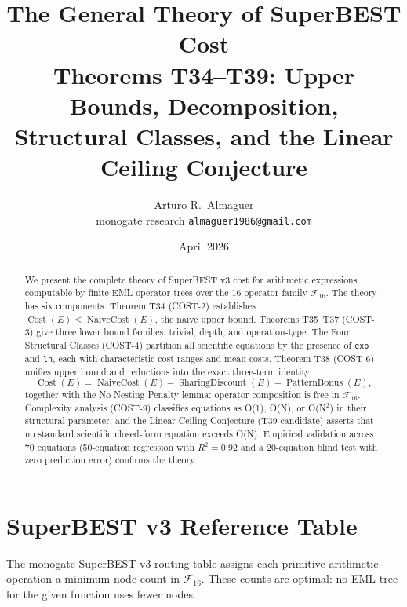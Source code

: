 \documentclass[12pt,a4paper]{article}
\title{The General Theory of SuperBEST Cost\\[6pt]
       \large Theorems T34--T39: Upper Bounds, Decomposition,\\
       Structural Classes, and the Linear Ceiling Conjecture}
\author{Arturo R.\ Almaguer\\
\small monogate research \quad \texttt{almaguer1986@gmail.com}}
\date{April 2026}
\theoremstyle{definition}
\newcommand{\Cost}{\operatorname{Cost}}
\newcommand{\NC}{\operatorname{NaiveCost}}
\newcommand{\SD}{\operatorname{SharingDiscount}}
\newcommand{\PB}{\operatorname{PatternBonus}}
\begin{document}
\maketitle

\begin{abstract}
We present the complete theory of SuperBEST v3 cost for arithmetic expressions
computable by finite EML operator trees over the 16-operator family
$\mathcal{F}_{16}$.
The theory has six components.
Theorem T34 (COST-2) establishes $\Cost(E) \leq \NC(E)$, the na\"{i}ve upper
bound.
Theorems T35--T37 (COST-3) give three lower bound families: trivial, depth,
and operation-type.
The Four Structural Classes (COST-4) partition all scientific equations by the
presence of \texttt{exp} and \texttt{ln}, each with characteristic cost ranges
and mean costs.
Theorem T38 (COST-6) unifies upper bound and reductions into the exact
three-term identity
\[
  \Cost(E) = \NC(E) - \SD(E) - \PB(E),
\]
together with the No Nesting Penalty lemma: operator composition is free in
$\mathcal{F}_{16}$.
Complexity analysis (COST-9) classifies equations as O(1), O(N), or O(N$^2$)
in their structural parameter, and the Linear Ceiling Conjecture (T39 candidate)
asserts that no standard scientific closed-form equation exceeds O(N).
Empirical validation across 70 equations (50-equation regression with $R^2=0.92$
and a 20-equation blind test with zero prediction error) confirms the theory.
\end{abstract}

\tableofcontents
\bigskip

\section{SuperBEST v3 Reference Table}
\label{sec:superbest}

The monogate SuperBEST v3 routing table assigns each primitive arithmetic
operation a minimum node count in $\mathcal{F}_{16}$.
These counts are optimal: no EML tree for the given function uses fewer nodes.
\end{document}
